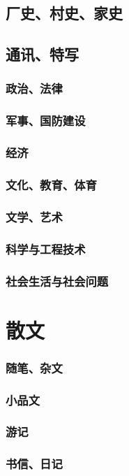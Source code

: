 \documentclass[UTF8]{../../RepresentationUniverse}
\begin{document}
    \subsection{厂史、村史、家史}
    \subsection{通讯、特写}
        \subsubsection{政治、法律}
        \subsubsection{军事、国防建设}
        \subsubsection{经济}
        \subsubsection{文化、教育、体育}
        \subsubsection{文学、艺术}
        \subsubsection{科学与工程技术}
        \subsubsection{社会生活与社会问题}



\section{散文}
\subsubsection{随笔、杂文}
\subsubsection{小品文}
\subsubsection{游记}
\subsubsection{书信、日记}
\end{document}
